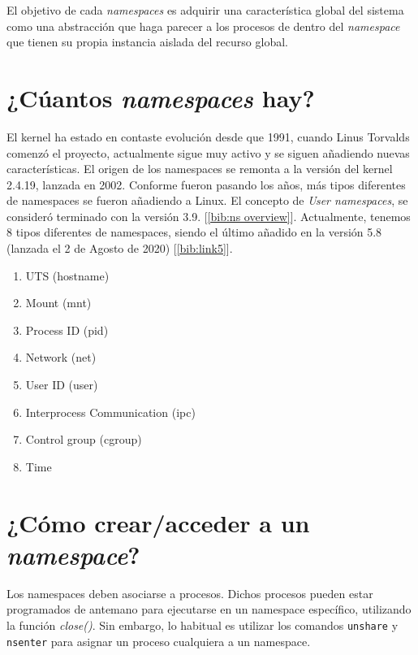 \documentclass[a4paper, oneside, 12pt]{book}
\begin{document}
	\par \noindent El objetivo de cada \textit{namespaces} es adquirir una característica global del sistema como una abstracción que haga parecer a los procesos de dentro del \textit{namespace} que tienen su propia instancia aislada del recurso global.
	
	\section{¿Cúantos \textit{namespaces} hay?}
	\par\noindent El kernel ha estado en contaste evolución desde que 1991, cuando Linus Torvalds comenzó el proyecto, actualmente sigue muy activo y se siguen añadiendo nuevas características. El origen de los namespaces se remonta a la versión del kernel 2.4.19, lanzada en 2002. Conforme fueron pasando los años, más tipos diferentes de namespaces se fueron añadiendo a Linux. El concepto de \textit{User namespaces}, se consideró terminado con la versión 3.9. [\ref{bib:ns overview}]. Actualmente, tenemos 8 tipos diferentes de namespaces, siendo el último añadido en la versión 5.8 (lanzada el 2 de Agosto de 2020) [\ref{bib:link5}]. 
	
	\begin{enumerate}
		\item UTS (hostname)
		\item Mount (mnt)
		\item Process ID (pid)
		\item Network (net)
		\item User ID (user) 
		\item Interprocess Communication (ipc)
		\item Control group (cgroup)
		\item Time
	\end{enumerate}
	
	
	\section{¿Cómo crear/acceder a un \textit{namespace}?}
	\noindent Los namespaces deben asociarse a procesos. Dichos procesos pueden estar programados de antemano para ejecutarse en un namespace específico, utilizando la función \textit{close()}. Sin embargo, lo habitual es utilizar los comandos \texttt{unshare} y \texttt{nsenter} para asignar un proceso cualquiera a un namespace.
	
\end{document}
